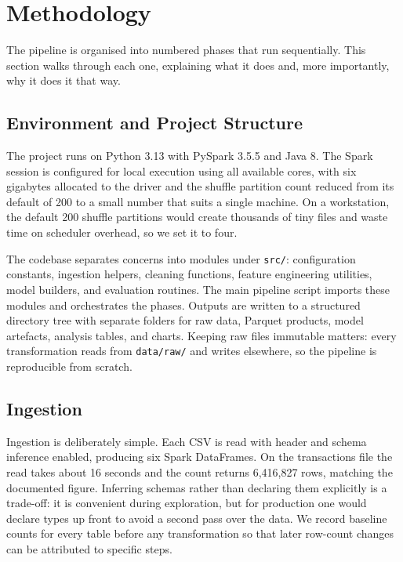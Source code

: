\documentclass[11pt,a4paper]{article}
\begin{document}
\section{Methodology}\label{sec:method}

The pipeline is organised into numbered phases that run sequentially. This section walks through each one, explaining what it does and, more importantly, why it does it that way.

\subsection{Environment and Project Structure}\label{sec:env}

The project runs on Python 3.13 with PySpark 3.5.5 and Java 8. The Spark session is configured for local execution using all available cores, with six gigabytes allocated to the driver and the shuffle partition count reduced from its default of 200 to a small number that suits a single machine. On a workstation, the default 200 shuffle partitions would create thousands of tiny files and waste time on scheduler overhead, so we set it to four.

The codebase separates concerns into modules under \texttt{src/}: configuration constants, ingestion helpers, cleaning functions, feature engineering utilities, model builders, and evaluation routines. The main pipeline script imports these modules and orchestrates the phases. Outputs are written to a structured directory tree with separate folders for raw data, Parquet products, model artefacts, analysis tables, and charts. Keeping raw files immutable matters: every transformation reads from \texttt{data/raw/} and writes elsewhere, so the pipeline is reproducible from scratch.

\subsection{Ingestion}

Ingestion is deliberately simple. Each CSV is read with header and schema inference enabled, producing six Spark DataFrames. On the transactions file the read takes about 16 seconds and the count returns 6,416,827 rows, matching the documented figure. Inferring schemas rather than declaring them explicitly is a trade-off: it is convenient during exploration, but for production one would declare types up front to avoid a second pass over the data. We record baseline counts for every table before any transformation so that later row-count changes can be attributed to specific steps.
\end{document}
